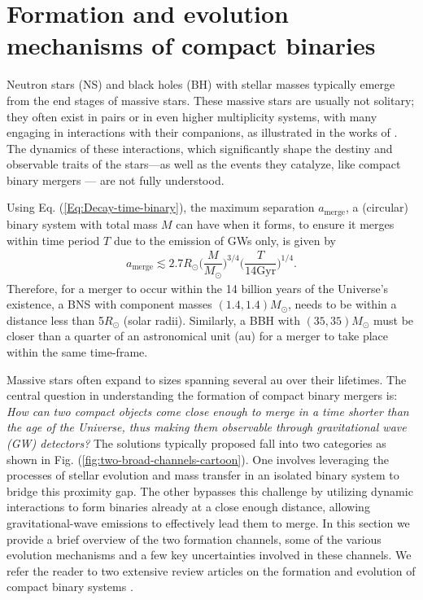 \section{Formation and evolution mechanisms of compact binaries}

Neutron stars (NS) and black holes (BH) with stellar masses typically emerge from the end stages of massive stars. These massive stars are usually not solitary; they often exist in pairs or in even higher multiplicity systems, with many engaging in interactions with their companions, as illustrated in the works of \cite{Sana:2012px,Moe2017}. The dynamics of these interactions, which significantly shape the destiny and observable traits of the stars—as well as the events they catalyze, like compact binary mergers — are not fully understood.

Using Eq. (\ref{Eq:Decay-time-binary}), the maximum separation $a_{\text{merge}}$, a (circular) binary system with total mass $M$ can have when it forms, to ensure it merges within time period $T$ due to the emission of GWs only, is given by
\begin{align}
    a_{\text{merge}} \lesssim 2.7 R_{\odot} \Bigg( \dfrac{M}{M_{\odot}} \Bigg)^{3/4} \Bigg(\dfrac{T}{14 \text{Gyr}}\Bigg)^{1/4}.
\end{align}
Therefore, for a merger to occur within the 14 billion years of the Universe's existence, a BNS with component masses $(1.4,1.4)M_{\odot}$, needs to be within a distance less than 5$R_{\odot}$ (solar radii). Similarly, a BBH with $(35,35)M_{\odot}$ must be closer than a quarter of an astronomical unit (au) for a merger to take place within the same time-frame.

Massive stars often expand to sizes spanning several au over their lifetimes. The central question in understanding the formation of compact binary mergers is: \textit{How can two compact objects come close enough to merge in a time shorter than the age of the Universe, thus making them observable through gravitational wave (GW) detectors?} The solutions typically proposed fall into two categories as shown in Fig. (\ref{fig:two-broad-channels-cartoon}). One involves leveraging the processes of stellar evolution and mass transfer in an isolated binary system to bridge this proximity gap. The other bypasses this challenge by utilizing dynamic interactions to form binaries already at a close enough distance, allowing gravitational-wave emissions to effectively lead them to merge. In this section we provide a brief overview of the two formation channels, some of the various evolution mechanisms and a few key uncertainties involved in these channels. We refer the reader to two extensive review articles on the formation and evolution of compact binary systems \cite{Postnov:2014tza, Mandel:2021smh}.

